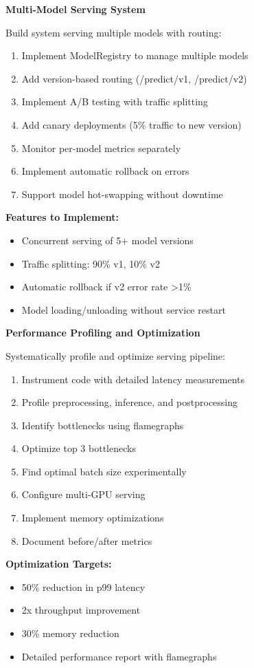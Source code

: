 \begin{exercise}
\textbf{Multi-Model Serving System}

Build system serving multiple models with routing:

\begin{enumerate}
    \item Implement ModelRegistry to manage multiple models
    \item Add version-based routing (/predict/v1, /predict/v2)
    \item Implement A/B testing with traffic splitting
    \item Add canary deployments (5\% traffic to new version)
    \item Monitor per-model metrics separately
    \item Implement automatic rollback on errors
    \item Support model hot-swapping without downtime
\end{enumerate}

\textbf{Features to Implement:}
\begin{itemize}
    \item Concurrent serving of 5+ model versions
    \item Traffic splitting: 90\% v1, 10\% v2
    \item Automatic rollback if v2 error rate >1\%
    \item Model loading/unloading without service restart
\end{itemize}
\end{exercise}

\begin{exercise}
\textbf{Performance Profiling and Optimization}

Systematically profile and optimize serving pipeline:

\begin{enumerate}
    \item Instrument code with detailed latency measurements
    \item Profile preprocessing, inference, and postprocessing
    \item Identify bottlenecks using flamegraphs
    \item Optimize top 3 bottlenecks
    \item Find optimal batch size experimentally
    \item Configure multi-GPU serving
    \item Implement memory optimizations
    \item Document before/after metrics
\end{enumerate}

\textbf{Optimization Targets:}
\begin{itemize}
    \item 50\% reduction in p99 latency
    \item 2x throughput improvement
    \item 30\% memory reduction
    \item Detailed performance report with flamegraphs
\end{itemize}
\end{exercise}

